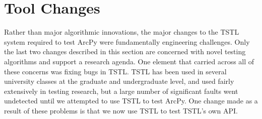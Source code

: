 \section{Tool Changes}

Rather than major algorithmic innovations, the major changes to the
TSTL system required to test ArcPy were fundamentally engineering
challenges.  Only the last two changes described in this section are
concerned with novel testing algorithms and support a research
agenda.  One element that carried across all of these concerns was
fixing bugs in TSTL.  TSTL has been used in several university classes
at the graduate and undergraduate level, and used fairly extensively
in testing research, but a large number of
significant faults went undetected until we attempted to use TSTL to
test ArcPy.  One change made as a result of these problems is that we
now use TSTL to test TSTL's own API.











